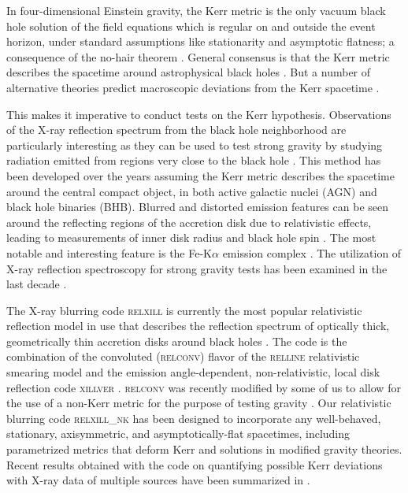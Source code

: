 \documentclass[aps,prd,twocolumn,superscriptaddress,nofootinbib,amsmath,amssymb]{revtex4-1}
\begin{document}
In four-dimensional Einstein gravity, the Kerr metric is the only vacuum black hole solution of the field equations which is regular on and outside the event horizon, under standard assumptions like stationarity and asymptotic flatness; a consequence of the no-hair theorem \citep{Kerr1963,Carter1971,Robinson1975}. General consensus is that the Kerr metric describes the spacetime around astrophysical black holes \citep{Price1972,Bambi2009,Bambi2014}. But a number of alternative theories predict macroscopic deviations from the Kerr spacetime \citep{Mathur2005,Dvali2011,Giddings2014,Berti2015,Giddings2017}. 

This makes it imperative to conduct tests on the Kerr hypothesis. Observations of the X-ray reflection spectrum from the black hole neighborhood are particularly interesting as they can be used to test strong gravity by studying radiation emitted from regions very close to the black hole \citep{Fabian2000}. This method has been developed over the years assuming the Kerr metric describes the spacetime around the central compact object, in both active galactic nuclei (AGN) and black hole binaries (BHB). Blurred and distorted emission features can be seen around the reflecting regions of the accretion disk due to relativistic effects, leading to measurements of inner disk radius and black hole spin \citep{Fabian1989,Laor1991,BR2006,Rey2008}. The most notable and interesting feature is the Fe-\textrm{K$\alpha$} emission complex \citep[e.g.,][]{LW1988,GR1988,Fabian1989,GF1991}. The utilization of X-ray reflection spectroscopy for strong gravity tests has been examined in the last decade \citep{Schee2009,JP2013,Bambi2013,Jiang2015a,Jiang2015b,Bambi2016a,
Zhou2016,Ni2016,Nampalliwar2018}.

The X-ray blurring code \textsc{relxill} is currently the most popular relativistic reflection model in use that describes the reflection spectrum of optically thick, geometrically thin accretion disks around black holes \citep{Garcia2014}. The code is the combination of the convoluted (\textsc{relconv}) flavor of the \textsc{relline} relativistic smearing model \citep{Dauser2010,Dauser2013} and the emission angle-dependent, non-relativistic, local disk reflection code \textsc{xillver} \citep{GK2010,Garcia2013}. \textsc{relconv} was recently modified by some of us to allow for the use of a non-Kerr metric for the purpose of testing gravity \citep{Bambi2017b}. Our relativistic blurring code \textsc{relxill\_nk} has been designed to incorporate any well-behaved, stationary, axisymmetric, and asymptotically-flat spacetimes, including parametrized metrics that deform Kerr and solutions in modified gravity theories. Recent results obtained with the code on quantifying  possible Kerr deviations with X-ray data of multiple sources have been summarized in \cite{Bambi2018}.
\end{document}
